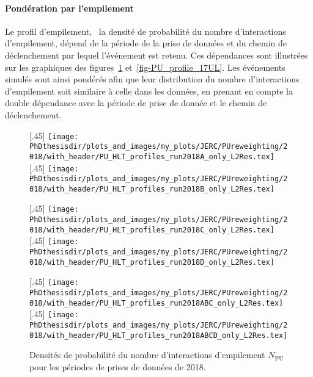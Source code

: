 \paragraph{Pondération par l'empilement}
Le profil d'empilement, \ie\ la densité de probabilité du nombre d'interactions d'empilement, dépend de la période de la prise de données et du chemin de déclenchement par lequel l'événement est retenu. Ces dépendances sont illustrées sur les graphiques des figures~\ref{fig-PU_profile_18} et~\ref{fig-PU_profile_17UL}.
Les événements simulés sont ainsi pondérés afin que leur distribution du nombre d'interactions d'empilement soit similaire à celle dans les données, en prenant en compte la double dépendance avec la période de prise de donnée et le chemin de déclenchement.
\begin{figure}[p]
\centering
{}[.45\textwidth]
{\texttt{[image: \\PhDthesisdir/plots\_and\_images/my\_plots/JERC/PUreweighting/2018/with\_header/PU\_HLT\_profiles\_run2018A\_only\_L2Res.tex]}\vspace{-.5\baselineskip}}
\hfill
{}[.45\textwidth]
{\texttt{[image: \\PhDthesisdir/plots\_and\_images/my\_plots/JERC/PUreweighting/2018/with\_header/PU\_HLT\_profiles\_run2018B\_only\_L2Res.tex]}\vspace{-.5\baselineskip}}

\vspace{.75\baselineskip}

[.45\textwidth]
{\texttt{[image: \\PhDthesisdir/plots\_and\_images/my\_plots/JERC/PUreweighting/2018/with\_header/PU\_HLT\_profiles\_run2018C\_only\_L2Res.tex]}\vspace{-.5\baselineskip}}
\hfill
{}[.45\textwidth]
{\texttt{[image: \\PhDthesisdir/plots\_and\_images/my\_plots/JERC/PUreweighting/2018/with\_header/PU\_HLT\_profiles\_run2018D\_only\_L2Res.tex]}\vspace{-.5\baselineskip}}

\vspace{.75\baselineskip}

[.45\textwidth]
{\texttt{[image: \\PhDthesisdir/plots\_and\_images/my\_plots/JERC/PUreweighting/2018/with\_header/PU\_HLT\_profiles\_run2018ABC\_only\_L2Res.tex]}\vspace{-.5\baselineskip}}
\hfill
{}[.45\textwidth]
{\texttt{[image: \\PhDthesisdir/plots\_and\_images/my\_plots/JERC/PUreweighting/2018/with\_header/PU\_HLT\_profiles\_run2018ABCD\_only\_L2Res.tex]}\vspace{-.5\baselineskip}}

\caption[Densités de probabilité de $N_\text{PU}$ pour 2018.]{Densités de probabilité du nombre d'interactions d'empilement $N_\text{PU}$ pour les périodes de prises de données de 2018.}
\label{fig-PU_profile_18}
\end{figure}
